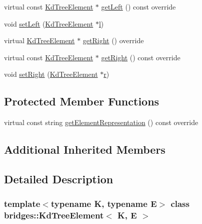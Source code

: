\begin{DoxyCompactItemize}
\item 
virtual const \mbox{\hyperlink{classbridges_1_1_kd_tree_element}{Kd\+Tree\+Element}} $\ast$ \mbox{\hyperlink{classbridges_1_1_kd_tree_element_ab58af4ca67cb3869c279bfc11952c070}{get\+Left}} () const override
\item 
void \mbox{\hyperlink{classbridges_1_1_kd_tree_element_a4aabf3ae1f9e77676f5c7b87181ada67}{set\+Left}} (\mbox{\hyperlink{classbridges_1_1_kd_tree_element}{Kd\+Tree\+Element}} $\ast$\mbox{\hyperlink{namespacebridges_acfb0a4f7877d8f63de3e6862004c50eda2db95e8e1a9267b7a1188556b2013b33}{l}})
\item 
virtual \mbox{\hyperlink{classbridges_1_1_kd_tree_element}{Kd\+Tree\+Element}} $\ast$ \mbox{\hyperlink{classbridges_1_1_kd_tree_element_a8e1090891a720231c2009d1d222471e9}{get\+Right}} () override
\item 
virtual const \mbox{\hyperlink{classbridges_1_1_kd_tree_element}{Kd\+Tree\+Element}} $\ast$ \mbox{\hyperlink{classbridges_1_1_kd_tree_element_a48e6a81eccf6d156e50865ef8066be82}{get\+Right}} () const override
\item 
void \mbox{\hyperlink{classbridges_1_1_kd_tree_element_a119124cbfcc0e792ea60cb56c0a63119}{set\+Right}} (\mbox{\hyperlink{classbridges_1_1_kd_tree_element}{Kd\+Tree\+Element}} $\ast$\mbox{\hyperlink{namespacebridges_acfb0a4f7877d8f63de3e6862004c50eda4b43b0aee35624cd95b910189b3dc231}{r}})
\end{DoxyCompactItemize}
\subsection*{Protected Member Functions}
\begin{DoxyCompactItemize}
\item 
virtual const string \mbox{\hyperlink{classbridges_1_1_kd_tree_element_ad8aa2d89689f33691063fee9c601e2cb}{get\+Element\+Representation}} () const override
\end{DoxyCompactItemize}
\subsection*{Additional Inherited Members}


\subsection{Detailed Description}
\subsubsection*{template$<$typename K, typename E$>$\newline
class bridges\+::\+Kd\+Tree\+Element$<$ K, E $>$}

